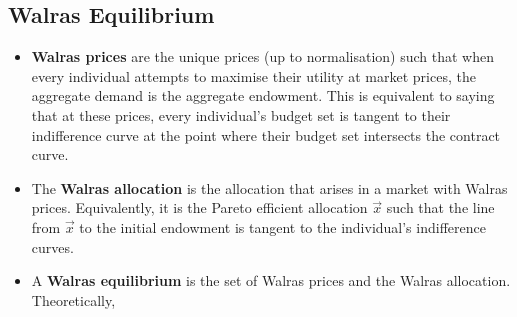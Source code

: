 \documentclass[a4paper]{article}
\begin{document}
\subsection{Walras Equilibrium}
\begin{itemize}
    \item \textbf{Walras prices} are the unique prices (up to normalisation) such that when every individual attempts to maximise their utility at market prices, the aggregate demand is the aggregate endowment. This is equivalent to saying that at these prices, every individual's budget set is tangent to their indifference curve at the point where their budget set intersects the contract curve.
    \item The \textbf{Walras allocation} is the allocation that arises in a market with Walras prices. Equivalently, it is the Pareto efficient allocation $\vec{x}$ such that the line from $\vec{x}$ to the initial endowment is tangent to the individual's indifference curves.
    \item A \textbf{Walras equilibrium} is the set of Walras prices and the Walras allocation. Theoretically,
\end{itemize}
\end{document}
